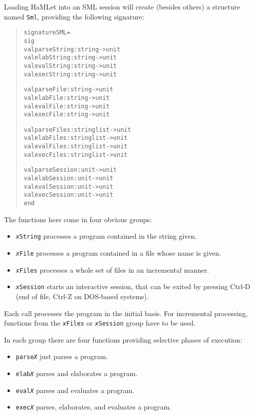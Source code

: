 \documentclass[twoside,titlepage]{article}
\begin{document}
Loading HaMLet into an SML session will create (besides others) a structure named {\tt Sml}, providing the following signature:

\begin{quote}
\begin{alltt}
signature SML =
sig
    val parseString :  string -> unit
    val elabString :   string -> unit
    val evalString :   string -> unit
    val execString :   string -> unit

    val parseFile :    string -> unit
    val elabFile :     string -> unit
    val evalFile :     string -> unit
    val execFile :     string -> unit

    val parseFiles :   string list -> unit
    val elabFiles :    string list -> unit
    val evalFiles :    string list -> unit
    val execFiles :    string list -> unit

    val parseSession : unit -> unit
    val elabSession :  unit -> unit
    val evalSession :  unit -> unit
    val execSession :  unit -> unit
end
\end{alltt}
\end{quote}

The functions here come in four obvious groups:

\begin{itemize}
\setlength{\parskip}{0ex}
\item {\tt{\sl x}String} processes a program contained in the string given.
\item {\tt{\sl x}File} processes a program contained in a file whose name is given.
\item {\tt{\sl x}Files} processes a whole set of files in an incremental manner.
\item {\tt{\sl x}Session} starts an interactive session, that can be exited by pressing Ctrl-D (end of file, Ctrl-Z on DOS-based systems).
\end{itemize}

Each call processes the program in the initial basis. For incremental processing, functions from the {\tt{\sl x}Files} or {\tt{\sl x}Session} group have to be used.

In each group there are four functions providing selective phases of execution:

\begin{itemize}
\setlength{\parskip}{0ex}
\item {\tt parse{\sl{X}}} just parses a program.
\item {\tt elab{\sl{X}}} parses and elaborates a program.
\item {\tt eval{\sl{X}}} parses and evaluates a program.
\item {\tt exec{\sl{X}}} parses, elaborates, and evaluates a program.
\end{itemize}
\end{document}
